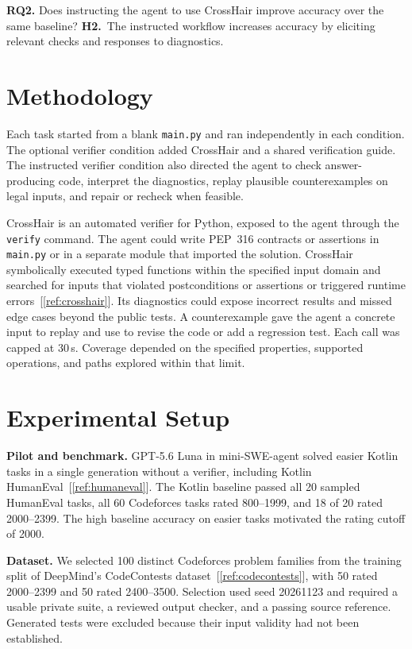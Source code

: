 \documentclass[11pt,a4paper]{article}
\begin{document}
\textbf{RQ2.} Does instructing the agent to use CrossHair improve accuracy over the same baseline?\newline
\textbf{H2.}~The instructed workflow increases accuracy by eliciting relevant checks and responses to diagnostics.

\section{Methodology}
Each task started from a blank \texttt{main.py} and ran independently in each condition. The optional verifier condition added CrossHair and a shared verification guide. The instructed verifier condition also directed the agent to check answer-producing code, interpret the diagnostics, replay plausible counterexamples on legal inputs, and repair or recheck when feasible.

CrossHair is an automated verifier for Python, exposed to the agent through the \texttt{verify} command. The agent could write PEP~316 contracts or assertions in \texttt{main.py} or in a separate module that imported the solution. CrossHair symbolically executed typed functions within the specified input domain and searched for inputs that violated postconditions or assertions or triggered runtime errors~[\ref{ref:crosshair}]. Its diagnostics could expose incorrect results and missed edge cases beyond the public tests. A counterexample gave the agent a concrete input to replay and use to revise the code or add a regression test. Each call was capped at 30\,s. Coverage depended on the specified properties, supported operations, and paths explored within that limit.

\newpage

\section{Experimental Setup}
\textbf{Pilot and benchmark.} GPT-5.6 Luna in mini-SWE-agent solved easier Kotlin tasks in a single generation without a verifier, including Kotlin HumanEval~[\ref{ref:humaneval}]. The Kotlin baseline passed all 20 sampled HumanEval tasks, all 60 Codeforces tasks rated 800--1999, and 18 of 20 rated 2000--2399. The high baseline accuracy on easier tasks motivated the rating cutoff of 2000.

\textbf{Dataset.} We selected 100 distinct Codeforces problem families from the training split of DeepMind's CodeContests dataset~[\ref{ref:codecontests}], with 50 rated 2000--2399 and 50 rated 2400--3500. Selection used seed 20261123 and required a usable private suite, a reviewed output checker, and a passing source reference. Generated tests were excluded because their input validity had not been established.
\end{document}
